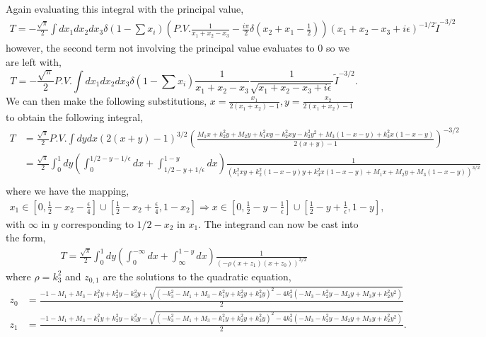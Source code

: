 \documentclass[twoside]{article}
\begin{document}
Again evaluating this integral with the principal value,
\begin{align}
  T = -\frac{\sqrt{\pi}}{2}\int dx_1dx_2dx_3\delta(1-\sum x_i)\left( P.V. \frac{1}{x_1 + x_2 - x_3} - \frac{i\pi}{2}\delta(x_2 + x_1 -
  \frac{1}{2}) \right)(x_1 + x_2 - x_3 + i\epsilon)^{-1/2}\tilde{I}^{-3/2}
\end{align}
however, the second term not involving the principal value evaluates to 0 so we are left with,
\begin{equation}
  \label{eq:trimxy}
  T = -\frac{\sqrt{\pi}}{2}P.V.\int dx_1dx_2dx_3 \delta(1-\sum x_i)\frac{1}{x_1 + x_2 - x_3}\frac{1}{\sqrt{x_1 + x_2 - x_3 + i\epsilon}}
  \tilde{I}^{-3/2}.
\end{equation}
We can then make the following substitutions, $x = \frac{x_1}{2(x_1 + x_2) - 1}, y = \frac{x_2}{2(x_1 + x_2) - 1}$ to obtain the
following integral,
\begin{align}
  T &=  \frac{\sqrt{\pi}}{2}P.V.\int dydx (2(x + y) - 1)^{3/2}\left( \frac{M_1x + k^2_2y + M_2y + k^2_1xy - k^2_2xy - k^2_2y^2 +
  M_3(1-x-y)+k^2_3x(1-x-y)}{2(x + y)-1} \right)^{-3/2}\\
  &= \frac{\sqrt{\pi}}{2}\int^1_0dy\left( \int^{1/2 - y - 1/\epsilon}_0dx + \int ^{1-y}_{1/2 - y + 1/\epsilon}dx \right)\frac{1}{(k^2_1xy +
  k^2_2(1-x-y)y + k^2_3x(1-x-y) + M_1x + M_2y + M_3(1-x-y))^{3/2}}\\
\end{align}
where we have the mapping,
\begin{align}
  x_1 \in \left[ 0, \frac{1}{2} - x_2 - \frac{\epsilon}{4} \right]\cup\left[ \frac{1}{2} - x_2 + \frac{\epsilon}{4}, 1 - x_2 \right] \Rightarrow
  x \in \left[ 0, \frac{1}{2} - y - \frac{1}{\epsilon} \right]\cup \left[ \frac{1}{2} - y + \frac{1}{\epsilon}, 1-y \right],
\end{align}
with $\infty$ in $y$ corresponding to $1/2 - x_2$ in $x_1$. The integrand can now be cast into the form,
\begin{align}
  T = \frac{\sqrt{\pi}}{2}\int^1_0dy\left( \int^{-\infty}_0dx + \int ^{1-y}_{\infty}dx \right)\frac{1}{\left( -\rho(x +z_1)(x + z_0)
  \right)^{3/2}}
\end{align}
where $\rho = k^2_3$ and $z_{0,1}$ are the solutions to the quadratic equation,
\begin{align}
  z_0 &= \frac{ -1 - M_1 + M_3 - k^2_1y + k^2_2y - k^2_3y + \sqrt{(-k^2_3 -M_1+M_3-k^2_1y+k^2_2y + k^2_3y)^2 -
  4k^2_3(-M_3-k^2_2y-M_2y+M_3y+k^2_2y^2)}}{2}\\
  z_1 &= \frac{ -1 - M_1 + M_3 - k^2_1y + k^2_2y - k^2_3y - \sqrt{(-k^2_3 - M_1 + M_3 - k^2_1y + k^2_2y + k^2_3y)^2 - 4k^2_3(-M_3 - k^2_2y - M_2y +
  M_3y + k^2_2y^2)}}{2}.
\end{align}
\end{document}
